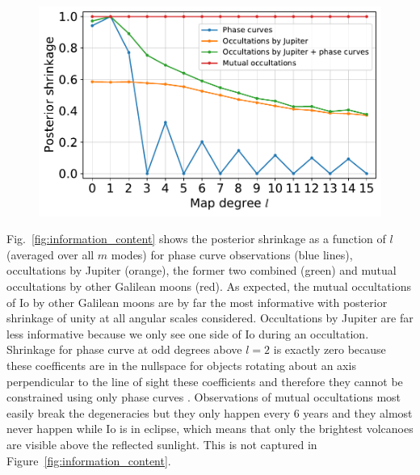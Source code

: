 \documentclass[modern]{aastex62}
\begin{document}
\begin{figure}[t!]
    \begin{centering}
    \includegraphics[width=\linewidth]{figures/information_content.pdf}
    \end{centering}
\end{figure}

Fig.~\ref{fig:information_content} shows the posterior shrinkage as a function of $l$ (averaged over all $m$ modes) for phase curve observations (blue lines), occultations by Jupiter (orange), the former two combined (green) and mutual occultations by other Galilean moons (red).
As expected, the mutual occultations of Io by other Galilean moons are by far the most informative with posterior shrinkage of unity at all angular scales considered. 
Occultations by Jupiter are far less informative because we only see one side of Io during an occultation.
Shrinkage for phase curve at odd degrees above $l=2$ is exactly zero because these coefficents are in the nullspace for objects rotating about an axis perpendicular to the line of sight these coefficients and therefore they cannot be constrained using only phase curves \citep{luger2021}. 
Observations of mutual occultations most easily break the degeneracies but they only happen every 6 years and they almost never happen while Io is in eclipse, which means that only the brightest volcanoes are visible above the reflected sunlight.
This is not captured in Figure~\ref{fig:information_content}. 
\end{document}
